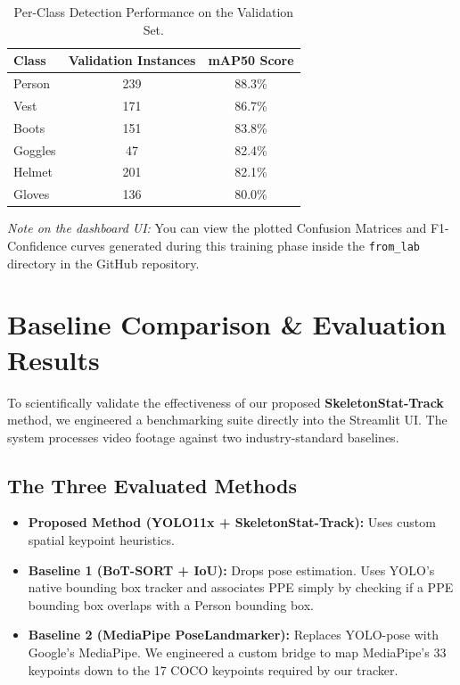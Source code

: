 \documentclass[12pt,a4paper]{article}
\begin{document}
\begin{table}[h]
\centering
\begin{tabular}{@{}lcc@{}}
\toprule
\textbf{Class} & \textbf{Validation Instances} & \textbf{mAP50 Score} \\ \midrule
Person & 239 & 88.3\% \\
Vest & 171 & 86.7\% \\
Boots & 151 & 83.8\% \\
Goggles & 47 & 82.4\% \\
Helmet & 201 & 82.1\% \\
Gloves & 136 & 80.0\% \\ \bottomrule
\end{tabular}
\caption{Per-Class Detection Performance on the Validation Set.}
\end{table}

\textit{Note on the dashboard UI:} You can view the plotted Confusion Matrices and F1-Confidence curves generated during this training phase inside the \texttt{from\_lab} directory in the GitHub repository.

\section{Baseline Comparison \& Evaluation Results}

To scientifically validate the effectiveness of our proposed \textbf{SkeletonStat-Track} method, we engineered a benchmarking suite directly into the Streamlit UI. The system processes video footage against two industry-standard baselines.

\subsection{The Three Evaluated Methods}
\begin{itemize}
    \item \textbf{Proposed Method (YOLO11x + SkeletonStat-Track):} Uses custom spatial keypoint heuristics.
    \item \textbf{Baseline 1 (BoT-SORT + IoU):} Drops pose estimation. Uses YOLO's native bounding box tracker and associates PPE simply by checking if a PPE bounding box overlaps with a Person bounding box.
    \item \textbf{Baseline 2 (MediaPipe PoseLandmarker):} Replaces YOLO-pose with Google's MediaPipe. We engineered a custom bridge to map MediaPipe's 33 keypoints down to the 17 COCO keypoints required by our tracker.
\end{itemize}
\end{document}
